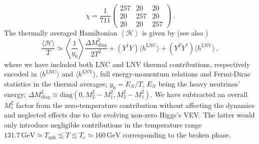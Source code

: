 \documentclass[12pt, a4paper]{article}
\def\sph{\text{sph}}
\def\LNC{\text{LNC}}
\def\LNV{\text{LNV}}
\begin{document}
 \begin{equation}
 \chi= \frac{1}{711}\begin{pmatrix} 257&20&20\\
 20&257&20\\
 20&20&257
 \end{pmatrix}\,.
\end{equation}
The thermally averaged Hamiltonian $\left\langle\mathcal{H}\right\rangle$ is given by \cite{Ghiglieri:2017gjz, Antusch:2017pkq} (see also \cite{Hernandez:2016kel, Abada:2018oly})
\begin{equation}
\frac{\langle \mathcal{H}\rangle}{T} \simeq \left\langle\frac{1}{y_0}\right\rangle \frac{\Delta M_\text{diag}^2}{2T^2} + (Y^\dagger Y)\langle h^{\LNC}\rangle + (Y^T Y^*)\langle h^{\LNV}\rangle\,, 
\label{eq:thermH}
\end{equation}
where we have included both LNC and LNV thermal contributions, respectively encoded in $\langle h^{\LNC}\rangle$ and $\langle h^{\LNV}\rangle$, full energy-momentum relations and Fermi-Dirac statistics in the thermal averages; $y_0=E_N/T$, $E_N$ being the heavy neutrinos' energy; $\Delta M_\text{diag}^2 \equiv \text{diag}(0,M_2^2-M_1^2, M_3^2-M_1^2)$. We have subtracted an overall $M_1^2$ factor from the zero-temperature contribution without affecting the dynamics and neglected effects due to the evolving non-zero Higgs's VEV. The latter would only introduce negligible contributions in the temperature range $131.7\,\text{GeV}\simeq T_{\sph}\lesssim T \lesssim T_c\simeq 160\,\text{GeV}$ corresponding to the broken phase.
\end{document}
